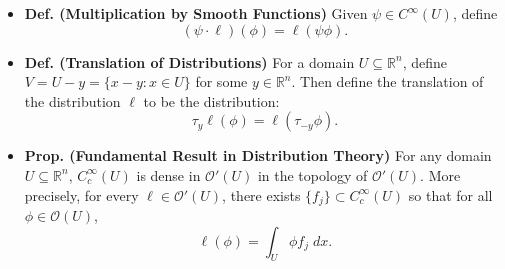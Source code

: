 \documentclass{article}
\begin{document}
\begin{itemize}
	\item \textbf{Def. (Multiplication by Smooth Functions)} Given $\psi \in C^{\infty}(U)$, define 
		\begin{equation}
			(\psi \cdot \ell)(\phi) = \ell(\psi \phi). 
		\end{equation}
		
	\item \textbf{Def. (Translation of Distributions)} For a domain $U \subseteq \mathbb{R}^{n}$, define $V = U - y = \{x - y: x \in U\}$ for some $y \in \mathbb{R}^{n}$. Then define the translation of the distribution $\ell$ to be the distribution: 
		\begin{equation}
			\tau_{y}\ell(\phi) = \ell(\tau_{-y}\phi). 
		\end{equation}
		
	\item \textbf{Prop. (Fundamental Result in Distribution Theory)} For any domain $U \subseteq \mathbb{R}^{n}$, $C_{c}^{\infty}(U)$ is dense in $\mathcal{O}'(U)$ in the topology of $\mathcal{O}'(U)$. More precisely, for every $\ell \in \mathcal{O}'(U)$, there exists $\{f_{j}\} \subset C_{c}^{\infty}(U)$ so that for all $\phi \in \mathcal{O}(U)$, 
		\begin{equation}
			\ell(\phi) = \int_{U}\phi f_{j}\;dx. 
		\end{equation}
	\end{itemize}
\end{document}
